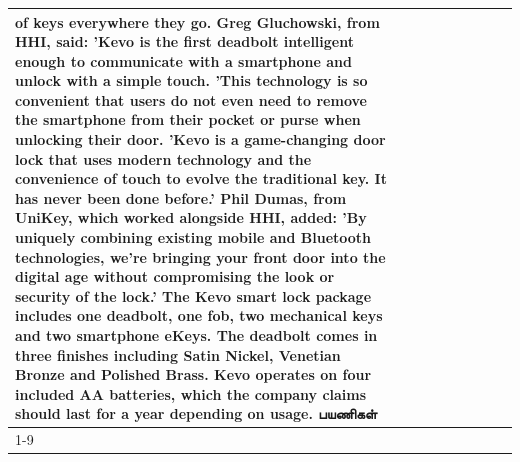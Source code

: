 \begin{table}[H]
\begin{tabular}{lllrlllll}
of keys everywhere they go. Greg Gluchowski, from HHI, said: 'Kevo is the first deadbolt intelligent enough to communicate with a smartphone and unlock with a simple touch. 'This technology is so convenient that users do not even need to remove the smartphone from their pocket or purse when unlocking their door. 'Kevo is a game-changing door lock that uses modern technology and the convenience of touch to evolve the traditional key. It has never been done before.' Phil Dumas, from UniKey, which worked alongside HHI, added: 'By uniquely combining existing mobile and Bluetooth technologies, we’re bringing your front door into the digital age without compromising the look or security of the lock.' The Kevo smart lock package includes one deadbolt, one fob, two mechanical keys and two smartphone eKeys. The deadbolt comes in three finishes including Satin Nickel, Venetian Bronze and Polished Brass. Kevo operates on four included AA batteries, which the company claims should last for a year depending on usage. பயணிகள் \\
\cline{1-9}

\end{tabular}
\end{table}
